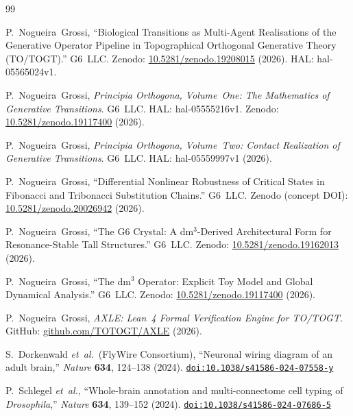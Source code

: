 \documentclass[12pt,a4paper]{article}
\begin{document}
\begin{thebibliography}{99}
\sloppy

P.~Nogueira~Grossi,
``Biological Transitions as Multi-Agent Realisations of the Generative
Operator Pipeline in Topographical Orthogonal Generative Theory
(TO/TOGT).''
G6~LLC. Zenodo:
\href{https://doi.org/10.5281/zenodo.19208015}{10.5281/zenodo.19208015}
(2026). HAL: hal-05565024v1.

P.~Nogueira~Grossi,
\textit{Principia Orthogona, Volume~One: The Mathematics of Generative
Transitions}.
G6~LLC. HAL: hal-05555216v1. Zenodo:
\href{https://doi.org/10.5281/zenodo.19117400}{10.5281/zenodo.19117400}
(2026).

P.~Nogueira~Grossi,
\textit{Principia Orthogona, Volume~Two: Contact Realization of
Generative Transitions}.
G6~LLC. HAL: hal-05559997v1 (2026).

P.~Nogueira~Grossi,
``Differential Nonlinear Robustness of Critical States in Fibonacci and
Tribonacci Substitution Chains.''
G6~LLC. Zenodo (concept DOI):
\href{https://doi.org/10.5281/zenodo.20026942}{10.5281/zenodo.20026942}
(2026).

P.~Nogueira~Grossi,
``The G6 Crystal: A dm$^3$-Derived Architectural Form for
Resonance-Stable Tall Structures.''
G6~LLC. Zenodo:
\href{https://doi.org/10.5281/zenodo.19162013}{10.5281/zenodo.19162013}
(2026).

P.~Nogueira~Grossi,
``The dm$^3$ Operator: Explicit Toy Model and Global Dynamical
Analysis.''
G6~LLC. Zenodo:
\href{https://doi.org/10.5281/zenodo.19117400}{10.5281/zenodo.19117400}
(2026).

P.~Nogueira~Grossi,
\textit{AXLE: Lean~4 Formal Verification Engine for TO/TOGT}.
GitHub:
\href{https://github.com/TOTOGT/AXLE}{github.com/TOTOGT/AXLE}
(2026).

S.~Dorkenwald \textit{et~al.}\ (FlyWire Consortium),
``Neuronal wiring diagram of an adult brain,''
\textit{Nature} \textbf{634}, 124--138 (2024).
\href{https://doi.org/10.1038/s41586-024-07558-y}{\nolinkurl{doi:10.1038/s41586-024-07558-y}}

P.~Schlegel \textit{et~al.},
``Whole-brain annotation and multi-connectome cell typing of
\textit{Drosophila},''
\textit{Nature} \textbf{634}, 139--152 (2024).
\href{https://doi.org/10.1038/s41586-024-07686-5}{\nolinkurl{doi:10.1038/s41586-024-07686-5}}


\end{thebibliography}
\end{document}
